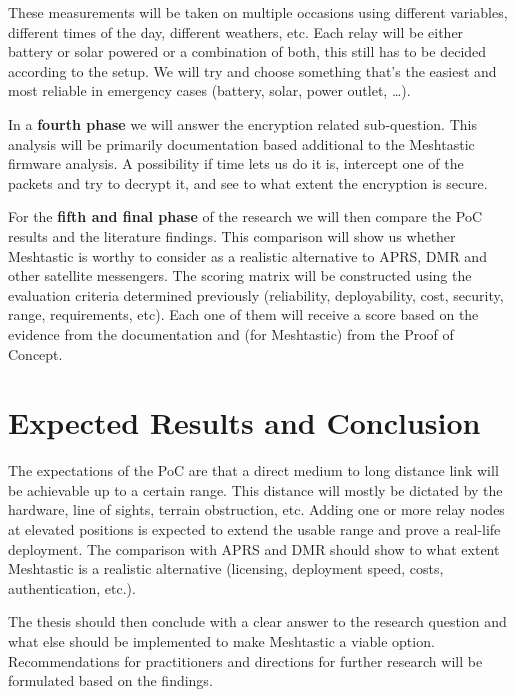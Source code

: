 These measurements will be taken on multiple occasions using different variables, different times of the day, different weathers, etc.
Each relay will be either battery or solar powered or a combination of both, this still has to be decided according to the setup.
We will try and choose something that's the easiest and most reliable in emergency
cases (battery, solar, power outlet, \ldots).


In a \textbf{fourth phase} we will answer the encryption related sub-question. This analysis will be primarily documentation based additional to the Meshtastic firmware analysis.
A possibility if time lets us do it is, intercept one of the packets and try to decrypt it, and see to what extent the encryption is secure.


For the \textbf{fifth and final phase} of the research we will then compare the PoC results and the literature findings.
This comparison will show us whether Meshtastic is worthy to consider as a realistic alternative to APRS, DMR and other satellite messengers.
The scoring matrix will be constructed using the evaluation criteria determined previously (reliability, deployability, cost, security, range, requirements, etc).
Each one of them will receive a score based on the evidence from the documentation and (for Meshtastic) from the Proof of Concept.



\section{Expected Results and Conclusion}%
\label{sec:expected-results}
The expectations of the PoC are that a direct medium to long distance link will be achievable up to a certain range.
This distance will mostly be dictated by the hardware, line of sights, terrain obstruction, etc.
Adding one or more relay nodes at elevated positions is expected to extend the usable range and prove a real-life deployment.
The comparison with APRS and DMR should show to what extent Meshtastic is a realistic alternative (licensing, deployment speed, costs, authentication, etc.).

The thesis should then conclude with a clear answer to the research question and what else should be implemented to make Meshtastic a viable option.
Recommendations for practitioners and directions for further research will be formulated based on the findings.